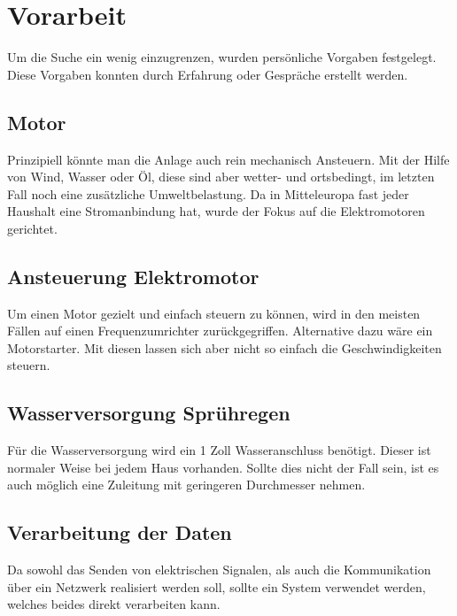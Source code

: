 \documentclass[12pt]{scrreprt} %
\begin{document}
\section{Vorarbeit}
\label{sec:vorarbeit}

Um die Suche ein wenig einzugrenzen, wurden persönliche Vorgaben festgelegt.
Diese Vorgaben konnten durch Erfahrung oder Gespräche erstellt werden.

\subsection{Motor}
\label{sec:motor}

Prinzipiell könnte man die Anlage auch rein mechanisch Ansteuern. Mit der Hilfe von Wind, Wasser oder Öl, diese sind aber wetter- und ortsbedingt, im letzten Fall noch eine zusätzliche Umweltbelastung. Da in Mitteleuropa fast jeder Haushalt eine Stromanbindung hat, wurde der Fokus auf die Elektromotoren gerichtet.

\subsection{Ansteuerung Elektromotor}
\label{sec:ansteuerungElektromotor}

Um einen Motor gezielt und einfach steuern zu können, wird in den meisten Fällen auf einen Frequenzumrichter zurückgegriffen. Alternative dazu wäre ein Motorstarter. Mit diesen lassen sich aber nicht so einfach die Geschwindigkeiten steuern.

\subsection{Wasserversorgung Sprühregen}
\label{sec:wasserversorgungSpruehregen}

Für die Wasserversorgung wird ein 1 Zoll Wasseranschluss benötigt. Dieser ist normaler Weise bei jedem Haus vorhanden. 
Sollte dies nicht der Fall sein, ist es auch möglich eine Zuleitung mit geringeren Durchmesser nehmen.

\subsection{Verarbeitung der Daten}
\label{sec:verarbeitungDerDaten}

Da sowohl das Senden von elektrischen Signalen, als auch die Kommunikation über ein Netzwerk realisiert werden soll, sollte ein System verwendet werden, welches beides direkt verarbeiten kann. 
\end{document}
